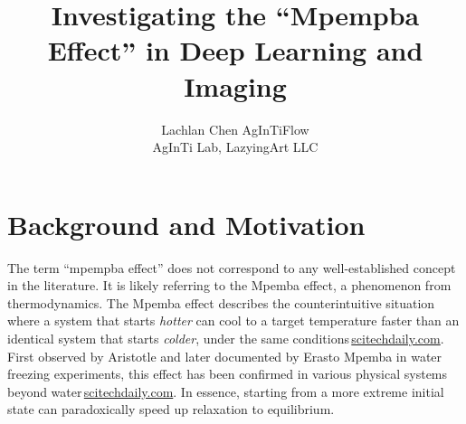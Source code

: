 \documentclass[11pt]{article}
\title{Investigating the ``Mpempba Effect'' in Deep Learning and Imaging}
\author{\begin{tabular}{c}Lachlan Chen \quad AgInTiFlow\\AgInTi Lab, LazyingArt LLC\end{tabular}}
\date{}
\begin{document}
\maketitle

\section{Background and Motivation}

The term ``mpempba effect'' does not correspond to any well-established concept in the literature. It is likely referring to the Mpemba effect, a phenomenon from thermodynamics. The Mpemba effect describes the counterintuitive situation where a system that starts \emph{hotter} can cool to a target temperature faster than an identical system that starts \emph{colder}, under the same conditions\,\href{https://scitechdaily.com/scientists-unravel-the-bizarre-physics-of-the-mpemba-effect/#:~:text=The Mpemba effect%2C whereby hotter,documenting the effect in water}{scitechdaily.com}. First observed by Aristotle and later documented by Erasto Mpemba in water freezing experiments, this effect has been confirmed in various physical systems beyond water\,\href{https://scitechdaily.com/scientists-unravel-the-bizarre-physics-of-the-mpemba-effect/#:~:text=The Mpemba effect%2C whereby hotter,documenting the effect in water}{scitechdaily.com}. In essence, starting from a more extreme initial state can paradoxically speed up relaxation to equilibrium.
\end{document}
